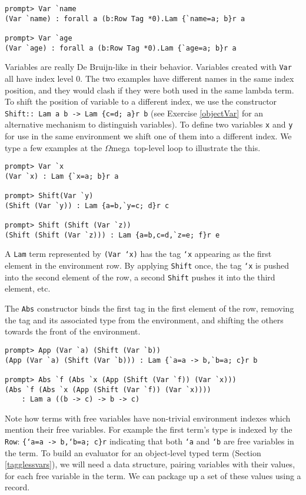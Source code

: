 \documentclass[11pt,twoside,A4]{llncs}
\newcommand{\om}{\emph{$\Omega$}mega}
\begin{document}
{\small
\begin{verbatim}
prompt> Var `name
(Var `name) : forall a (b:Row Tag *0).Lam {`name=a; b}r a
   
prompt> Var `age
(Var `age) : forall a (b:Row Tag *0).Lam {`age=a; b}r a
\end{verbatim}}

Variables are really De Bruijn-like in their behavior. Variables created
with {\tt Var} all have index level 0. The two examples have different
names in the same index position, and they would clash if they were both
used in the same lambda term. To shift the position of variable to a
different index, we use the constructor \verb+Shift:: Lam a b -> Lam {c=d; a}r b+
(see Exercise \ref{objectVar} for an alternative mechanism to distinguish
variables). To define two variables {\tt x} and {\tt y} for use in the
same environment we shift one of them into a different index. We type a
few examples at the \om\ top-level loop to illustrate the this.

{\small
\begin{verbatim}
prompt> Var `x
(Var `x) : Lam {`x=a; b}r a 

prompt> Shift(Var `y)
(Shift (Var `y)) : Lam {a=b,`y=c; d}r c

prompt> Shift (Shift (Var `z))
(Shift (Shift (Var `z))) : Lam {a=b,c=d,`z=e; f}r e
\end{verbatim}} 
\noindent
A {\tt Lam} term represented by {\tt (Var `x)} has the tag {\tt `x} appearing
as the first element in the environment row. By applying {\tt Shift}
once, the tag {\tt `x} is pushed into the second element of the row,
a second {\tt Shift} pushes it into the third element, etc.

The {\tt Abs} constructor binds the first tag in the
first element of the row, removing the tag and its associated type
from the environment, and shifting the others towards the
front of the environment.

{\small
\begin{verbatim}
prompt> App (Var `a) (Shift (Var `b))
(App (Var `a) (Shift (Var `b))) : Lam {`a=a -> b,`b=a; c}r b

prompt> Abs `f (Abs `x (App (Shift (Var `f)) (Var `x)))
(Abs `f (Abs `x (App (Shift (Var `f)) (Var `x)))) 
    : Lam a ((b -> c) -> b -> c)
\end{verbatim}} 
\noindent

Note how terms with free variables have non-trivial environment
indexes which mention their free variables. 
For example the first term's type is indexed
by the {\tt Row}: {\small {\tt \{`a=a -> b,`b=a; c\}r}} indicating
that both {\tt `a} and {\tt `b} are free variables in the term.
To build an evaluator
for an object-level typed term (Section \ref{tagglessvars}), we
will need a data structure, pairing variables with their values,
for each free variable in the term. We can package up a set of
these values using a record.
\end{document}
